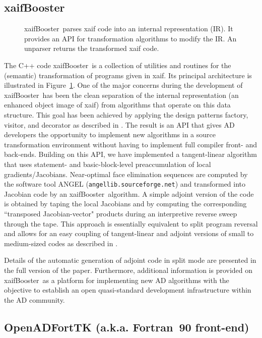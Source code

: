 \documentclass[acmtocl,acmnow]{acmtrans2m}
\newcommand{\xaifBooster}{xaifBooster}
\newcommand{\reffig}[1]{Figure~\ref{#1}}
\begin{document}
\subsection{\xaifBooster} 
\begin{figure}
\caption{\xaifBooster\ parses xaif code into an internal representation (IR).
It provides an API for transformation algorithms to modify the IR. An unparser
returns the transformed xaif code.} \label{fig:xaifBooster}
\end{figure}
The C++ code \xaifBooster\ is a collection of utilities and routines for the
(semantic) transformation of programs given in xaif. Its principal architecture 
is illustrated in \reffig{fig:xaifBooster}. One of the major concerns during
the development of \xaifBooster\ has been the clean separation of the internal
representation (an enhanced object image of xaif) from algorithms that operate 
on this data structure. This goal has been achieved by applying the design 
patterns \cite{DesignPatterns} factory, visitor, and decorator as described in \cite{UtNa03}.
The result is an API that gives AD developers the opportunity
to implement new algorithms in a source transformation environment without
having to implement full compiler front- and back-ends. Building on
this API, we have implemented a tangent-linear algorithm that uses statement-
\cite{SEUpreacc} and basic-block-level preaccumulation of local 
gradients/Jacobians. Near-optimal face elimination \cite{ElimTechMP} sequences 
are computed by the software tool 
ANGEL \cite{AGN03,SAGA} ({\tt angellib.sourceforge.net}) and transformed into 
Jacobian code by
an \xaifBooster\ algorithm. A simple adjoint version of the code is obtained
by taping the local Jacobians 
and by computing the corresponding ``transposed Jacobian-vector" products 
during an interpretive reverse sweep through the tape. This approach is
essentially equivalent to split program reversal \cite{Gri00} and allows
for an easy coupling of tangent-linear and adjoint versions of small to 
medium-sized codes as described in \cite{NaHe03}. 

Details of the automatic generation of adjoint code in split mode are presented
in the full version of the paper. Furthermore, additional information is 
provided on \xaifBooster\ as a platform for implementing new AD algorithms with 
the objective to establish an open quasi-standard development infrastructure
within the AD community.
\subsection{OpenADFortTK (a.k.a. Fortran~90 front-end)}
\end{document}
